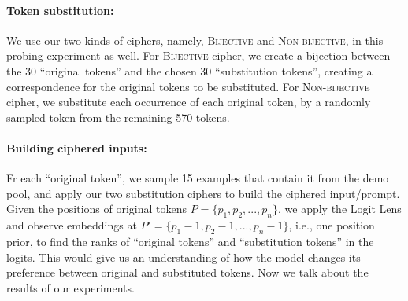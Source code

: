 \documentclass[11pt]{article}
\newcommand{\muhan}[1]{{\color{green}[{\bf Muhan}: #1]}}
\begin{document}
\paragraph{Token substitution:}
We use our two kinds of ciphers, namely,  \textsc{Bijective} and \textsc{Non-bijective}, in this probing experiment as well.
For \textsc{Bijective} cipher, we create a bijection between the 30 ``original tokens'' and the chosen 30 ``substitution tokens'', creating a correspondence for the original tokens to be substituted.
For \textsc{Non-bijective} cipher, we substitute each occurrence of each original token, by a randomly sampled token from the remaining 570 tokens.

\paragraph{Building ciphered inputs: }
Fr each ``original token'', we sample 15 examples that contain it from the demo pool, and apply our two substitution ciphers to build the ciphered input/prompt.
Given the positions of original tokens $P = \{p_1, p_2, ..., p_n\}$, we apply the Logit Lens and observe embeddings at $P' = \{p_1-1, p_2-1, ..., p_n-1\}$, i.e., one position prior, to find the ranks of ``original tokens'' and ``substitution tokens'' in the logits. This would give us an understanding of how the model changes its preference between original and substituted tokens. Now we talk about the results of our experiments.
\end{document}
